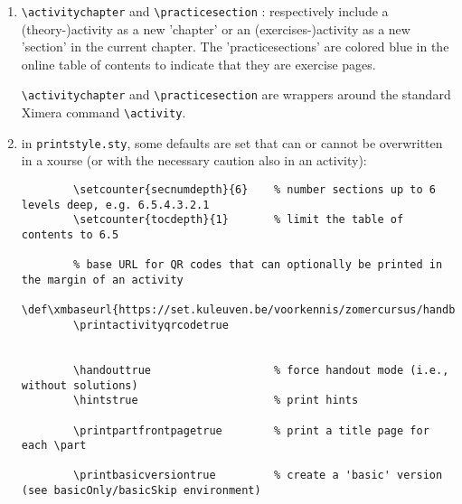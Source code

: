 \documentclass{ximera}
\begin{document}
\begin{enumerate}
    \item \verb|\activitychapter|  and \verb|\practicesection| : respectively include a (theory-)activity as a new 'chapter' or an (exercises-)activity as a new 'section' in the current chapter. The 'practicesections' are colored blue in the online table of contents to indicate that they are exercise pages.

    \verb|\activitychapter| and \verb|\practicesection| are wrappers around the standard Ximera command \verb|\activity|.

    \item in \verb|printstyle.sty|, some defaults are set that can or cannot be overwritten in a xourse (or with the necessary caution also in an activity):
    \begin{verbatim}
        \setcounter{secnumdepth}{6}    % number sections up to 6 levels deep, e.g. 6.5.4.3.2.1
        \setcounter{tocdepth}{1}       % limit the table of contents to 6.5

        % base URL for QR codes that can optionally be printed in the margin of an activity
        \def\xmbaseurl{https://set.kuleuven.be/voorkennis/zomercursus/handboekB/}
        \printactivityqrcodetrue

        
        \handouttrue                   % force handout mode (i.e., without solutions)
        \hintstrue                     % print hints

        \printpartfrontpagetrue        % print a title page for each \part

        \printbasicversiontrue         % create a 'basic' version (see basicOnly/basicSkip environment)
    \end{verbatim}

\end{enumerate}
\end{document}
